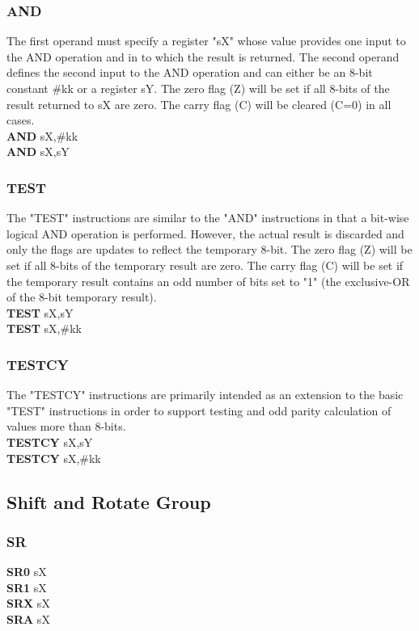         \subsubsection{AND}
            The first operand must specify a register "sX" whose value provides one input to the AND operation and in to which the result is returned. The second operand defines the second input to the AND operation and can either be an 8-bit constant \#kk or a register sY. The zero flag (Z) will be set if all 8-bits of the result returned to sX are zero. The carry flag (C) will be cleared (C=0) in all cases.\\
            \textbf{AND} sX,\#kk\\
            \textbf{AND} sX,sY\\

        \subsubsection{TEST}
            The "TEST" instructions are similar to the "AND" instructions in that a bit-wise logical AND operation is performed. However, the actual result is discarded and only the flags are updates to reflect the temporary 8-bit. The zero flag (Z) will be set if all 8-bits of the temporary result are zero. The carry flag (C) will be set if the temporary result contains an odd number of bits set to "1" (the exclusive-OR of the 8-bit temporary result).\\
            \textbf{TEST} sX,sY\\
            \textbf{TEST} sX,\#kk\\

        \subsubsection{TESTCY}
            The "TESTCY" instructions are primarily intended as an extension to the basic "TEST" instructions in order to support testing and odd parity calculation of values more than 8-bits.\\
            \textbf{TESTCY} sX,sY\\
            \textbf{TESTCY} sX,\#kk\\

        \subsection{Shift and Rotate Group}
            \subsubsection{SR}
                \textbf{SR0} sX\\
                \textbf{SR1} sX\\
                \textbf{SRX} sX\\
                \textbf{SRA} sX\\

